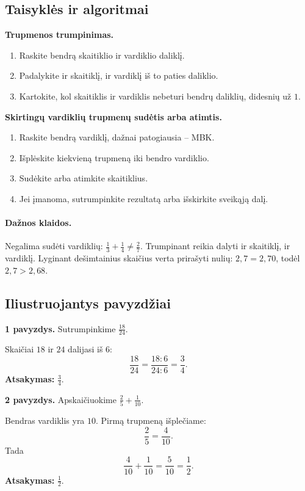 \subsection{Taisyklės ir algoritmai}
\textbf{Trupmenos trumpinimas.}
\begin{enumerate}[label=\arabic*.]
\item Raskite bendrą skaitiklio ir vardiklio daliklį.
\item Padalykite ir skaitiklį, ir vardiklį iš to paties daliklio.
\item Kartokite, kol skaitiklis ir vardiklis nebeturi bendrų daliklių, didesnių už \(1\).
\end{enumerate}

\textbf{Skirtingų vardiklių trupmenų sudėtis arba atimtis.}
\begin{enumerate}[label=\arabic*.]
\item Raskite bendrą vardiklį, dažnai patogiausia -- MBK.
\item Išplėskite kiekvieną trupmeną iki bendro vardiklio.
\item Sudėkite arba atimkite skaitiklius.
\item Jei įmanoma, sutrumpinkite rezultatą arba išskirkite sveikąją dalį.
\end{enumerate}

\paragraph{Dažnos klaidos.}
Negalima sudėti vardiklių: \(\frac{1}{3}+\frac{1}{4}\ne \frac{2}{7}\). Trumpinant reikia dalyti ir skaitiklį, ir vardiklį. Lyginant dešimtainius skaičius verta prirašyti nulių: \(2,7=2,70\), todėl \(2,7>2,68\).

\subsection{Iliustruojantys pavyzdžiai}
\textbf{1 pavyzdys.} Sutrumpinkime \(\frac{18}{24}\).

Skaičiai \(18\) ir \(24\) dalijasi iš \(6\):
\[
\frac{18}{24}=\frac{18:6}{24:6}=\frac{3}{4}.
\]
\textbf{Atsakymas:} \(\frac{3}{4}\).

\textbf{2 pavyzdys.} Apskaičiuokime \(\frac{2}{5}+\frac{1}{10}\).

Bendras vardiklis yra \(10\). Pirmą trupmeną išplečiame:
\[
\frac{2}{5}=\frac{4}{10}.
\]
Tada
\[
\frac{4}{10}+\frac{1}{10}=\frac{5}{10}=\frac{1}{2}.
\]
\textbf{Atsakymas:} \(\frac{1}{2}\).

